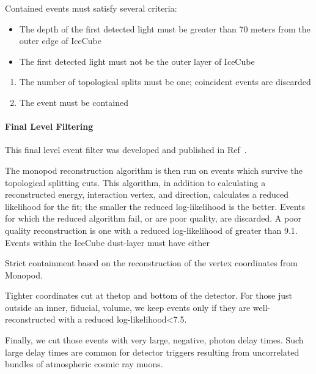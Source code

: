 \documentclass[main.tex]{subfiles}
\begin{document}
Contained events must satisfy several criteria:
\begin{itemize}
    \item The depth of the first detected light must be greater than 70 meters from the outer edge of IceCube
    \item The first detected light must not be the outer layer of IceCube
\end{itemize}

\begin{enumerate}
    \item The number of topological splits must be one; coincident events are discarded
    \item The event must be contained 
\end{enumerate}

\paragraph{Final Level Filtering}

This final level event filter was developed and published in Ref~\cite{2018PhDT17N}.

The monopod reconstruction algorithm is then run on events which survive the topological splitting cuts. 
This algorithm, in addition to calculating a reconstructed energy, interaction vertex, and direction, calculates a  reduced likelihood for the fit; the smaller the reduced log-likelihood is the better. 
Events for which the reduced algorithm fail, or are poor quality, are discarded. 
A poor quality reconstruction is one with a reduced log-likelihood of greater than 9.1.
Events within the IceCube dust-layer must have either 

Strict containment based on the reconstruction of the vertex coordinates from Monopod. 

Tighter coordinates cut at thetop and bottom of the detector. For those just outside an inner, fiducial, volume, we keep events only if they are well-reconstructed with a reduced log-likelihood<7.5. 

Finally, we cut those events with very large, negative, photon delay times. Such large delay times are common for detector triggers resulting from uncorrelated bundles of atmospheric cosmic ray muons. 
\end{document}
